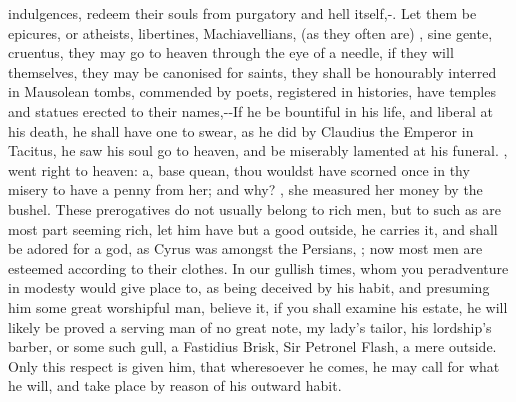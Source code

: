 {indulgences, redeem their souls from purgatory and hell itself,-. Let them be epicures, or atheists, libertines,
Machiavellians, (as they often are) ,
sine gente, cruentus, they may go to heaven through the eye of a
needle, if they will themselves, they may be canonised for saints, they
shall be honourably interred in Mausolean tombs, commended by
poets, registered in histories, have temples and statues erected to
their names,--If he be bountiful in
his life, and liberal at his death, he shall have one to swear, as he
did by Claudius the Emperor in Tacitus, he saw his soul go to heaven,
and be miserably lamented at his funeral. , went right to
heaven: a, base quean, thou wouldst have scorned once in thy
misery to have a penny from her; and why? , she
measured her money by the bushel. These prerogatives do not usually
belong to rich men, but to such as are most part seeming rich, let him
have but a good outside, he carries it, and shall be adored for a
god, as Cyrus was amongst the Persians, 
; now most men are esteemed according to their
clothes. In our gullish times, whom you peradventure in modesty would
give place to, as being deceived by his habit, and presuming him some
great worshipful man, believe it, if you shall examine his estate, he
will likely be proved a serving man of no great note, my lady's tailor,
his lordship's barber, or some such gull, a Fastidius Brisk, Sir
Petronel Flash, a mere outside. Only this respect is given him, that
wheresoever he comes, he may call for what he will, and take place by
reason of his outward habit.

}
